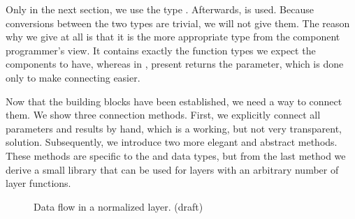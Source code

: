 
\bc
Only in the next section, we use the type . Afterwards,  is used. Because conversions between the two types are trivial, we will not give them. The reason why we give  at all is that it is the more appropriate type from the component programmer's view. It contains exactly the function types we expect the components to have, whereas in , present returns the  parameter, which is done only to make connecting easier.
\ec

\bc
Now that the building blocks have been established, we need a way to connect them. We show three connection methods. First, we explicitly connect all parameters and results by hand, which is a working, but not very transparent, solution. Subsequently, we introduce two more elegant and abstract methods. These methods are specific to the  and  data types, but from the last method we derive a small library that can be used for layers with an arbitrary number of layer functions. 
\ec

\begin{figure}
\begin{small}
\begin{center}
\begin{center}
\begin{minipage}[b]{\textwidth}
\begin{scriptsize}
\end{scriptsize}
\end{minipage}
\end{center}\caption{Data flow in a normalized layer. (draft)}\label{wrapped} 
\end{center}
\end{small}
\end{figure}


